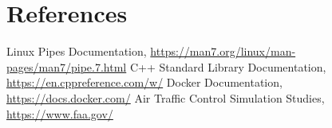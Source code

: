 \documentclass[conference]{IEEEtran}
\begin{document}
\section{References}
\begin{thebibliography}{9}
     Linux Pipes Documentation, \url{https://man7.org/linux/man-pages/man7/pipe.7.html}
     C++ Standard Library Documentation, \url{https://en.cppreference.com/w/}
     Docker Documentation, \url{https://docs.docker.com/}
     Air Traffic Control Simulation Studies, \url{https://www.faa.gov/}
\end{thebibliography}
\end{document}

